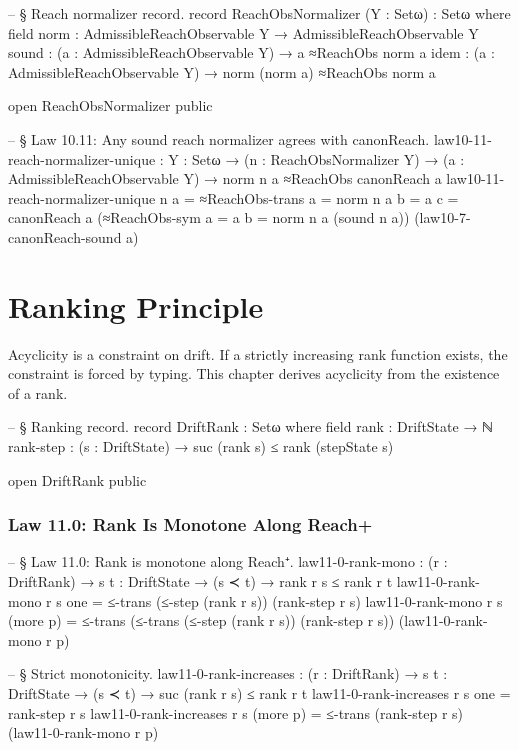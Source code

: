 \documentclass[11pt,a4paper]{book}
\def\texorpdfstring#1#2{#2}%
\begin{document}
\begin{code}
-- § Reach normalizer record.
record ReachObsNormalizer (Y : Setω) : Setω where
  field
    norm  : AdmissibleReachObservable Y → AdmissibleReachObservable Y
    sound : (a : AdmissibleReachObservable Y) → a ≈ReachObs norm a
    idem  : (a : AdmissibleReachObservable Y) → norm (norm a) ≈ReachObs norm a

open ReachObsNormalizer public

-- § Law 10.11: Any sound reach normalizer agrees with canonReach.
law10-11-reach-normalizer-unique :
  {Y : Setω} →
  (n : ReachObsNormalizer Y) →
  (a : AdmissibleReachObservable Y) →
  norm n a ≈ReachObs canonReach a
law10-11-reach-normalizer-unique n a =
  ≈ReachObs-trans
    {a = norm n a}
    {b = a}
    {c = canonReach a}
    (≈ReachObs-sym {a = a} {b = norm n a} (sound n a))
    (law10-7-canonReach-sound a)
\end{code}

\chapter{Ranking Principle}

Acyclicity is a constraint on drift. If a strictly increasing rank function exists, the constraint is forced by typing. This chapter derives acyclicity from the existence of a rank.

\begin{code}
-- § Ranking record.
record DriftRank : Setω where
  field
    rank      : DriftState → ℕ
    rank-step : (s : DriftState) → suc (rank s) ≤ rank (stepState s)

open DriftRank public
\end{code}

\subsection{Law 11.0: Rank Is Monotone Along Reach\texorpdfstring{$^+$}{+}}

\begin{code}
-- § Law 11.0: Rank is monotone along Reach⁺.
law11-0-rank-mono : (r : DriftRank) → {s t : DriftState} → (s ≺ t) → rank r s ≤ rank r t
law11-0-rank-mono r {s} one =
  ≤-trans (≤-step (rank r s)) (rank-step r s)
law11-0-rank-mono r {s} (more p) =
  ≤-trans
    (≤-trans (≤-step (rank r s)) (rank-step r s))
    (law11-0-rank-mono r p)

-- § Strict monotonicity.
law11-0-rank-increases : (r : DriftRank) → {s t : DriftState} → (s ≺ t) → suc (rank r s) ≤ rank r t
law11-0-rank-increases r {s} one = rank-step r s
law11-0-rank-increases r {s} (more p) =
  ≤-trans (rank-step r s) (law11-0-rank-mono r p)
\end{code}
\end{document}
